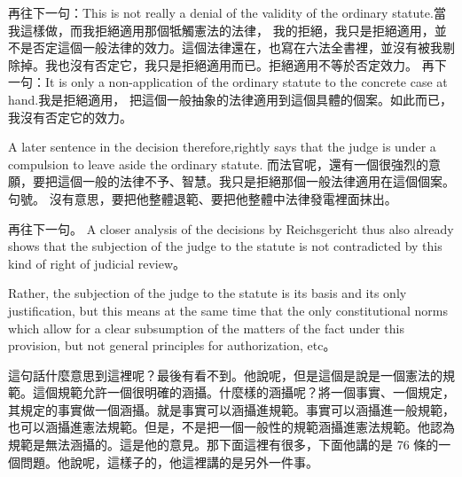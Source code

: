 \hypertarget{w05:cue:304}{}再往下一句：This is not really a denial of the validity of the ordinary statute.當我這樣做，而我拒絕適用那個牴觸憲法的法律，
\hypertarget{w05:cue:305}{}我的拒絕，我只是拒絕適用，並不是否定這個一般法律的效力。這個法律還在，也寫在六法全書裡，並沒有被我剔除掉。我也沒有否定它，我只是拒絕適用而已。拒絕適用不等於否定效力。
\hypertarget{w05:cue:306}{}再下一句：It is only a non-application of the ordinary statute to the concrete case at hand.我是拒絕適用，
\hypertarget{w05:cue:307}{}把這個一般抽象的法律適用到這個具體的個案。如此而已，我沒有否定它的效力。

\hypertarget{w05:cue:308}{}A later sentence in the decision therefore,rightly says that the judge is under a compulsion to leave aside the ordinary statute.
\hypertarget{w05:cue:309}{}而法官呢，還有一個很強烈的意願，要把這個一般的法律不予、智慧。我只是拒絕那個一般法律適用在這個個案。句號。
\hypertarget{w05:cue:310}{}沒有意思，要把他整體退範、要把他整體中法律發電裡面抹出。

\hypertarget{w05:cue:311}{}再往下一句。
\hypertarget{w05:cue:312}{}A closer analysis of the decisions by Reichsgericht thus also already shows that the subjection of the judge to the statute is not contradicted by this kind of right of judicial review。

\hypertarget{w05:cue:313}{}Rather, the subjection of the judge to the statute is its basis and its only justification, but this means at the same time that
\hypertarget{w05:cue:314}{}the only constitutional norms which allow for a clear subsumption of the matters of the fact under this provision, but not general principles for authorization, etc。

\hypertarget{w05:cue:315}{}這句話什麼意思到這裡呢？最後有看不到。他說呢，但是這個是說是一個憲法的規範。這個規範允許一個很明確的涵攝。什麼樣的涵攝呢？將一個事實、一個規定，
\hypertarget{w05:cue:316}{}其規定的事實做一個涵攝。就是事實可以涵攝進規範。事實可以涵攝進一般規範，也可以涵攝進憲法規範。但是，不是把一個一般性的規範涵攝進憲法規範。他認為規範是無法涵攝的。這是他的意見。那下面這裡有很多，下面他講的是 76 條的一個問題。他說呢，這樣子的，他這裡講的是另外一件事。

